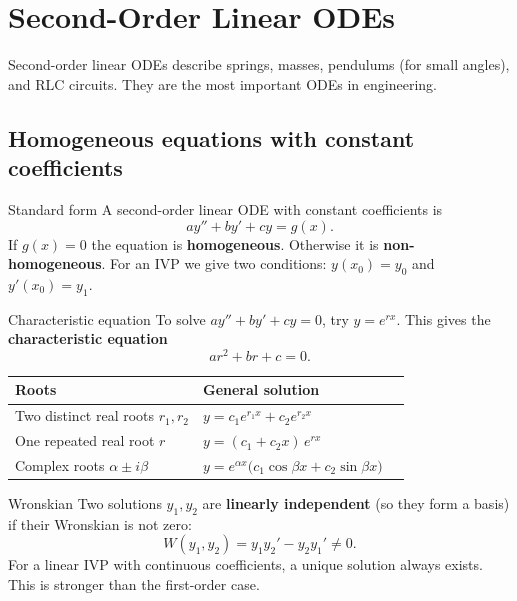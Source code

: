 \chapter{Second-Order Linear ODEs}

Second-order linear ODEs describe springs, masses, pendulums (for small angles), and RLC circuits. They are the most important ODEs in engineering.

\section{Homogeneous equations with constant coefficients}

\begin{defbox}{Standard form}
A second-order linear ODE with constant coefficients is
\[ ay'' + by' + cy = g(x). \]
If $g(x)=0$ the equation is \textbf{homogeneous}. Otherwise it is \textbf{non-homogeneous}. For an IVP we give two conditions: $y(x_0)=y_0$ and $y'(x_0)=y_1$.
\end{defbox}

\begin{methodbox}{Characteristic equation}
To solve $ay'' + by' + cy = 0$, try $y = e^{rx}$. This gives the \textbf{characteristic equation}
\[ ar^2 + br + c = 0 . \]
\begin{center}
\begin{tabular}{@{}lll@{}}
\toprule
Roots & General solution \\
\midrule
Two distinct real roots $r_1, r_2$ & $y = c_1e^{r_1x} + c_2e^{r_2x}$ \\[3pt]
One repeated real root $r$ & $y = (c_1 + c_2x)\,e^{rx}$ \\[3pt]
Complex roots $\alpha \pm i\beta$ & $y = e^{\alpha x}\big(c_1\cos\beta x + c_2\sin\beta x\big)$ \\
\bottomrule
\end{tabular}
\end{center}
\end{methodbox}

\begin{defbox}{Wronskian}
Two solutions $y_1, y_2$ are \textbf{linearly independent} (so they form a basis) if their Wronskian is not zero:
\[ W(y_1,y_2) = y_1y_2' - y_2y_1' \neq 0 . \]
For a linear IVP with continuous coefficients, a unique solution always exists. This is stronger than the first-order case.
\end{defbox}

